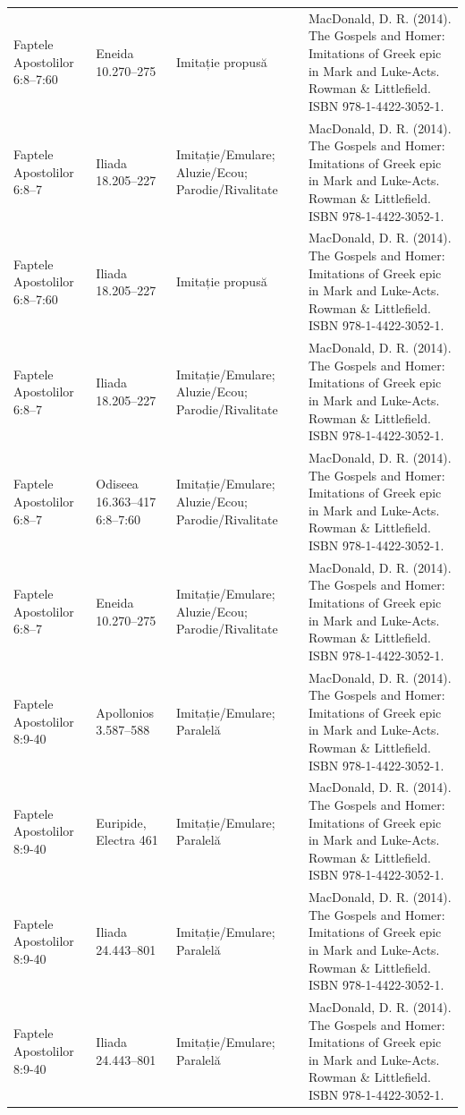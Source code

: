 \documentclass[12pt,a4paper,twoside,openany]{book}
\begin{document}
\begin{longtable}{L{1.4cm}L{1.7cm}L{3.1cm}L{8.4cm}}
Faptele Apostolilor 6:8–7:60 & Eneida 10.270–275 & Imitație propusă & MacDonald, D. R. (2014). The Gospels and Homer: Imitations of Greek epic in Mark and Luke-Acts. Rowman \& Littlefield. ISBN 978-1-4422-3052-1. \\
Faptele Apostolilor 6:8–7 & Iliada 18.205–227 & Imitație/Emulare; Aluzie/Ecou; Parodie/Rivalitate & MacDonald, D. R. (2014). The Gospels and Homer: Imitations of Greek epic in Mark and Luke-Acts. Rowman \& Littlefield. ISBN 978-1-4422-3052-1. \\
Faptele Apostolilor 6:8–7:60 & Iliada 18.205–227 & Imitație propusă & MacDonald, D. R. (2014). The Gospels and Homer: Imitations of Greek epic in Mark and Luke-Acts. Rowman \& Littlefield. ISBN 978-1-4422-3052-1. \\
Faptele Apostolilor 6:8–7 & Iliada 18.205–227 & Imitație/Emulare; Aluzie/Ecou; Parodie/Rivalitate & MacDonald, D. R. (2014). The Gospels and Homer: Imitations of Greek epic in Mark and Luke-Acts. Rowman \& Littlefield. ISBN 978-1-4422-3052-1. \\
Faptele Apostolilor 6:8–7 & Odiseea 16.363–417 6:8–7:60 & Imitație/Emulare; Aluzie/Ecou; Parodie/Rivalitate & MacDonald, D. R. (2014). The Gospels and Homer: Imitations of Greek epic in Mark and Luke-Acts. Rowman \& Littlefield. ISBN 978-1-4422-3052-1. \\
Faptele Apostolilor 6:8–7 & Eneida 10.270–275 & Imitație/Emulare; Aluzie/Ecou; Parodie/Rivalitate & MacDonald, D. R. (2014). The Gospels and Homer: Imitations of Greek epic in Mark and Luke-Acts. Rowman \& Littlefield. ISBN 978-1-4422-3052-1. \\
Faptele Apostolilor 8:9-40 & Apollonios 3.587–588 & Imitație/Emulare; Paralelă & MacDonald, D. R. (2014). The Gospels and Homer: Imitations of Greek epic in Mark and Luke-Acts. Rowman \& Littlefield. ISBN 978-1-4422-3052-1. \\
Faptele Apostolilor 8:9-40 & Euripide, Electra 461 & Imitație/Emulare; Paralelă & MacDonald, D. R. (2014). The Gospels and Homer: Imitations of Greek epic in Mark and Luke-Acts. Rowman \& Littlefield. ISBN 978-1-4422-3052-1. \\
Faptele Apostolilor 8:9-40 & Iliada 24.443–801 & Imitație/Emulare; Paralelă & MacDonald, D. R. (2014). The Gospels and Homer: Imitations of Greek epic in Mark and Luke-Acts. Rowman \& Littlefield. ISBN 978-1-4422-3052-1. \\
Faptele Apostolilor 8:9-40 & Iliada 24.443–801 & Imitație/Emulare; Paralelă & MacDonald, D. R. (2014). The Gospels and Homer: Imitations of Greek epic in Mark and Luke-Acts. Rowman \& Littlefield. ISBN 978-1-4422-3052-1. \\

\end{longtable}
\end{document}
